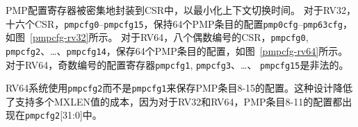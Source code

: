 {\iffalse
The PMP configuration registers are densely packed into CSRs to minimize
context-switch time.
For RV32, sixteen CSRs, {\tt pmpcfg0}--{\tt pmpcfg15}, hold the configurations
{\tt pmp0cfg}--{\tt pmp63cfg} for the 64 PMP entries, as shown in
Figure~\ref{pmpcfg-rv32}.
For RV64, eight even-numbered CSRs,
{\tt pmpcfg0}, {\tt pmpcfg2}, \ldots, {\tt pmpcfg14}, hold the configurations
for the 64 PMP entries, as shown in Figure~\ref{pmpcfg-rv64}.
For RV64, the odd-numbered configuration registers,
{\tt pmpcfg1}, {\tt pmpcfg3}, \ldots, {\tt pmpcfg15}, are illegal.
\fi
PMP配置寄存器被密集地封装到CSR中，以最小化上下文切换时间。
对于RV32，十六个CSR，{\tt pmpcfg0}--{\tt pmpcfg15}，保持64个PMP条目的配置{\tt pmp0cfg}--{\tt pmp63cfg}，如图~\ref{pmpcfg-rv32}所示。
对于RV64，八个偶数编号的CSR，{\tt pmpcfg0}, {\tt pmpcfg2}、\ldots、{\tt pmpcfg14}，保存64个PMP条目的配置，如图~\ref{pmpcfg-rv64}所示。
对于RV64，奇数编号的配置寄存器{\tt pmpcfg1}, {\tt pmpcfg3}、\ldots、 {\tt pmpcfg15}是非法的。

\iffalse
\begin{commentary}
RV64 systems use {\tt pmpcfg2}, rather than {\tt pmpcfg1}, to hold
configurations for PMP entries 8--15.  This design reduces the cost of
supporting multiple MXLEN values, since the configurations for PMP
entries 8--11 appear in {\tt pmpcfg2}[31:0] for both RV32 and RV64.
\end{commentary}
\fi
\begin{commentary}
RV64系统使用{\tt pmpcfg2}而不是{\tt pmpcfg1}来保存PMP条目8-15的配置。这种设计降低了支持多个MXLEN值的成本，因为对于RV32和RV64，PMP条目8-11的配置都出现在{\tt pmpcfg2}[31:0]中。
\end{commentary}

}
